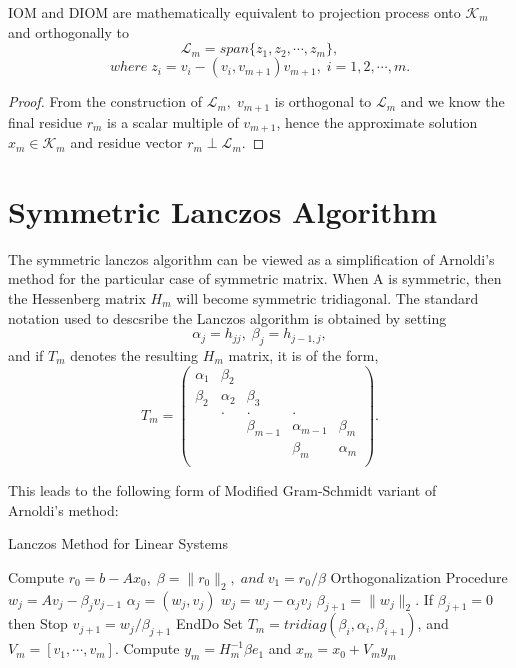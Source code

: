 \documentclass[10pt,a4paper]{article}
\begin{document}
\begin{prop}
IOM and DIOM are mathematically equivalent to projection process onto $\mathcal{K}_m$ and orthogonally to
$$\mathcal{L}_m=span\{z_1,z_2,\cdots,z_m\},$$
$$where\;z_i=v_i-(v_i,v_{m+1})v_{m+1},\;i=1,2,\cdots,m.$$
\end{prop}

\begin{proof}
From the construction of $\mathcal{L}_m,\;v_{m+1}$ is orthogonal to $\mathcal{L}_m$ and we know the final residue $r_m$ is a scalar multiple of $v_{m+1}$, hence the approximate solution $x_m\in\mathcal{K}_m$ and residue vector $r_m\perp\mathcal{L}_m$.  
\end{proof}

\section{Symmetric Lanczos Algorithm}

The symmetric lanczos algorithm can be viewed as a simplification of Arnoldi's method for the particular case of symmetric matrix. When A is symmetric, then the Hessenberg matrix $H_m$ will become symmetric tridiagonal. The standard notation used to descsribe the Lanczos algorithm is obtained by setting 
$$\alpha_j=h_{jj},\;\beta_j=h_{j-1,j},$$
and if $T_m$ denotes the resulting $H_m$ matrix, it is of the form,
$$
T_m = \left( \begin{array}{ccccc}
\alpha_1 & \beta_2 &  &  &  \\
\beta_2 & \alpha_2 & \beta_3 &  &  \\
 & . & . & . &  \\
 &  & \beta_{m-1} & \alpha_{m-1} & \beta_{m} \\
 &  &  & \beta_m & \alpha_m \\
\end{array} \right). 
$$

This leads to the following form of Modified Gram-Schmidt variant of \\ Arnoldi's method:

\begin{algorithm}
\caption{Lanczos Method for Linear Systems}
\begin{algorithmic}[1]
\State Compute $r_0=b-Ax_0,\;\beta=\|r_0\|_2,\;and\;v_1=r_0/\beta$
 \Comment Orthogonalization Procedure
	\State $w_j = Av_j-\beta_jv_{j-1}$
	\State $\alpha_j=(w_j,v_j)$
	\State $w_j = w_j-\alpha_jv_j$
	\State $\beta_{j+1} = \|w_j\|_2.$ If $\beta_{j+1}=0$ then Stop
	\State $v_{j+1} = w_j/\beta_{j+1}$
\EndFor
\State EndDo
\State Set $T_m=tridiag(\beta_i,\alpha_i,\beta_{i+1})$, and $V_m=[v_1,\cdots,v_m].$
\State Compute $y_m=H^{-1}_m\beta e_1$ and $x_m=x_0+V_my_m$
\end{algorithmic}
\end{algorithm}
\end{document}
